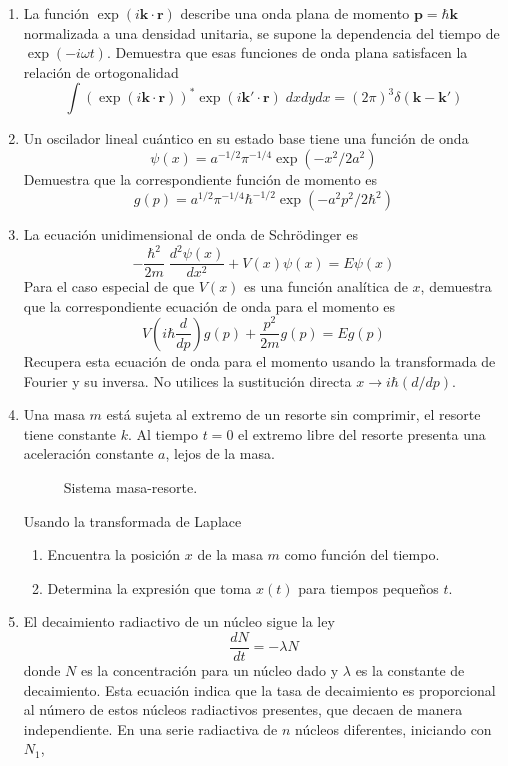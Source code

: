 \begin{enumerate}
\item La función $\exp(i\mathbf{k} \cdot \mathbf{r})$ describe una onda plana de momento $\mathbf{p} = \hbar \mathbf{k}$ normalizada a una densidad unitaria, se supone la dependencia del tiempo de $\exp(-i \omega t)$. Demuestra que esas funciones de onda plana satisfacen la relación de ortogonalidad
\[ \int ( \exp(i \mathbf{k} \cdot \mathbf{r} ))^{*}  \exp(i \mathbf{k}' \cdot \mathbf{r}) \; dx dy dx =  (2 \pi)^{3} \delta(\mathbf{k} - \mathbf{k}')  \]
\item Un oscilador lineal cuántico en su estado base tiene una función de onda
\[ \psi(x) = a^{-1/2} \pi^{-1/4} \exp(-x^{2}/2a^{2}) \]
Demuestra que la correspondiente función de momento es
\[ g(p) = a^{1/2} \pi^{-1/4} \hbar^{-1/2} \exp(-a^{2}p^{2}/2\hbar^{2}) \]
\item La ecuación unidimensional de onda de Schrödinger es
\[ - \dfrac{\hbar^{2}}{2m} \; \dfrac{d^{2} \psi(x)}{d x^{2}} +  V(x) \psi(x) = E \psi (x) \]
Para el caso especial de que $V(x)$ es una función analítica de $x$, demuestra que la correspondiente ecuación de onda para el momento es
\[ V \left( i \hbar \dfrac{d}{dp} \right) g(p) + \dfrac{p^{2}}{2m} g(p) =  E g(p)  \]
Recupera esta ecuación de onda para el momento usando la transformada de Fourier y su inversa. No utilices la sustitución directa $x \to i \hbar (d/dp)$.
\item Una masa $m$ está sujeta al extremo de un resorte sin comprimir, el resorte tiene constante $k$. Al tiempo $t=0$ el extremo libre del resorte presenta una aceleración constante $a$, lejos de la masa. 
\begin{figure}[H]
\centering

\caption{Sistema masa-resorte.}
\label{fig:figura1}
\end{figure}
Usando la transformada de Laplace
\begin{enumerate}[label=\alph*)]
\item Encuentra la posición $x$ de la masa $m$ como función del tiempo.
\item Determina la expresión que toma $x(t)$ para tiempos pequeños $t$.
\end{enumerate}
\item El decaimiento radiactivo de un núcleo sigue la ley
\[ \dfrac{d N}{d t} = - \lambda N \]
donde $N$ es la concentración para un núcleo dado y $\lambda$ es la constante de decaimiento. Esta ecuación indica que la tasa de decaimiento es proporcional al número de estos núcleos radiactivos presentes, que decaen de manera independiente. En una serie radiactiva de $n$ núcleos diferentes, iniciando con $N_{1}$,

\end{enumerate}
